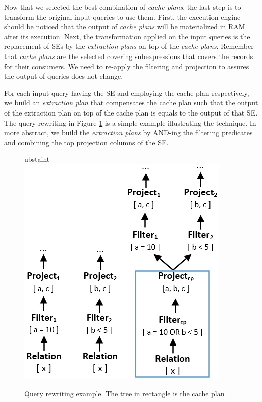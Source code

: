 Now that we selected the best combination of \emph{cache plans}, the last step is to transform the original input queries to use them. First, the execution engine should be noticed that the output of \emph{cache plans} will be materialized in RAM after its execution. Next, the transformation applied on the input queries is the replacement of SEs by the \emph{extraction plans} on top of the \emph{cache plans}. Remember that \emph{cache plans} are the selected covering subexpressions that covers the records for their consumers. We need to re-apply the filtering and projection to assures the output of queries does not change.

For each input query having the SE and employing the cache plan respectively, we build an \emph{extraction plan} that compensates the cache plan such that the output of the extraction plan on top of the cache plan is equals to the output of that SE. The query rewriting in Figure \ref{fig:rewrite} is a simple example illustrating the technique. In more abstract, we build the \emph{extraction plans} by AND-ing the filtering predicates and combining the top projection columns of the SE.

\begin{figure}[!htb]
	\centering
ubstaint	\includegraphics[scale=0.55]{figures/rewrite}
	\caption{Query rewriting example. The tree in rectangle is the cache plan}
   	\label{fig:rewrite}
\end{figure}